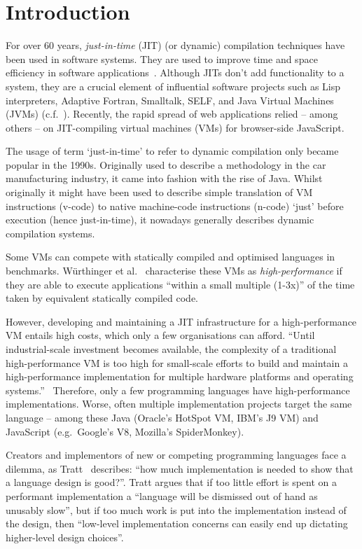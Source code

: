 
\section{Introduction}

For over 60 years, \emph{just-in-time} (JIT) (or dynamic) compilation techniques
have been used in software systems. They are used to improve time and space
efficiency in software applications~\cite{aycock2003brief}. Although JITs don't
add functionality to a system, they are a crucial element of influential
software projects such as Lisp interpreters, Adaptive Fortran, Smalltalk, SELF,
and Java Virtual Machines (JVMs) (c.f.~\cite{arnold2005survey}). Recently, the
rapid spread of web applications relied -- among others -- on JIT-compiling
virtual machines (VMs) for browser-side JavaScript.

The usage of term `just-in-time' to refer to dynamic compilation only became
popular in the 1990s. Originally used to describe a methodology in the car
manufacturing industry, it came into fashion with the rise of Java. Whilst
originally it might have been used to describe simple translation of VM
instructions (v-code) to native machine-code instructions (n-code) `just' before
execution (hence just-in-time), it nowadays generally describes dynamic
compilation systems.

Some VMs can compete with statically compiled and optimised languages in
benchmarks. W\"urthinger et al.~\cite{wurthinger2013one} characterise these VMs
as \emph{high-performance} if they are able to execute applications ``within a
small multiple (1-3x)'' of the time taken by equivalent statically compiled
code.

However, developing and maintaining a JIT infrastructure for a high-performance
VM entails high costs, which only a few organisations can afford. ``Until
industrial-scale investment becomes available, the complexity of a traditional
high-performance VM is too high for small-scale efforts to build and maintain a
high-performance implementation for multiple hardware platforms and operating
systems.''~\cite{wurthinger2013one}
Therefore, only a few programming languages have high-performance
implementations. Worse, often multiple implementation projects target the same
language -- among these Java (Oracle's HotSpot VM, IBM's J9 VM) and JavaScript
(e.g.~Google's V8, Mozilla's SpiderMonkey).

Creators and implementors of new or competing programming languages face a
dilemma, as Tratt~\cite{tratt_fast_enough} describes: ``how much implementation
is needed to show that a language design is good?''. Tratt argues that if too
little effort is spent on a performant implementation a ``language will be
dismissed out of hand as unusably slow'', but if too much work is put into the
implementation instead of the design, then ``low-level implementation concerns
can easily end up dictating higher-level design choices''.

